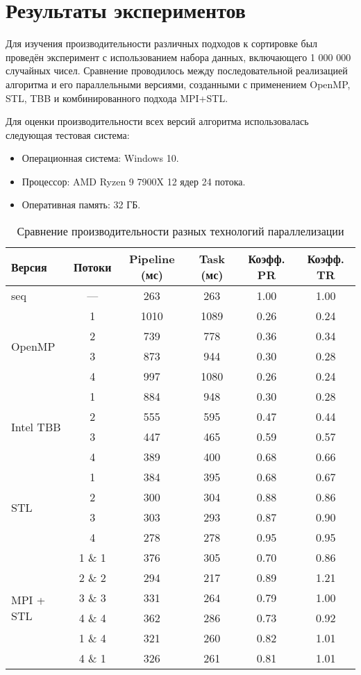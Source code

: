 \documentclass[12pt]{article}
\begin{document}
\newpage

\section{Результаты экспериментов}
Для изучения производительности различных подходов к сортировке был проведён эксперимент с использованием набора данных, включающего 1 000 000 случайных чисел. Сравнение проводилось между последовательной реализацией алгоритма и его параллельными версиями, созданными с применением OpenMP, STL, TBB и комбинированного подхода MPI+STL.

Для оценки производительности всех версий алгоритма использовалась следующая тестовая система:
\begin{itemize}
    \item Операционная система: Windows 10.
    \item Процессор: AMD Ryzen 9 7900X 12 ядер 24 потока.
    \item Оперативная память: 32 ГБ.
\end{itemize}

\begin{table}[H]
\centering
\begin{tabular}{|l|c|c|c|c|c|}
\hline
\textbf{Версия} & \textbf{Потоки} & \textbf{Pipeline (мс)} & \textbf{Task (мс)} & \textbf{Коэфф. PR} & \textbf{Коэфф. TR} \\
\hline
seq & —    & 263 & 263 & 1.00 & 1.00 \\
\hline
\multirow{4}{*}{OpenMP} 
    & 1    & 1010 & 1089 & 0.26 & 0.24 \\
    & 2    & 739  & 778  & 0.36 & 0.34 \\
    & 3    & 873  & 944  & 0.30 & 0.28 \\
    & 4    & 997  & 1080 & 0.26 & 0.24 \\
\hline
\multirow{4}{*}{Intel TBB} 
    & 1    & 884  & 948  & 0.30 & 0.28 \\
    & 2    & 555  & 595  & 0.47 & 0.44 \\
    & 3    & 447  & 465  & 0.59 & 0.57 \\
    & 4    & 389  & 400  & 0.68 & 0.66 \\
\hline
\multirow{4}{*}{STL} 
    & 1    & 384  & 395  & 0.68 & 0.67 \\
    & 2    & 300  & 304  & 0.88 & 0.86 \\
    & 3    & 303  & 293  & 0.87 & 0.90 \\
    & 4    & 278  & 278  & 0.95 & 0.95 \\
\hline
\multirow{6}{*}{MPI + STL} 
    & 1 \& 1 & 376  & 305  & 0.70 & 0.86 \\
    & 2 \& 2& 294  & 217  & 0.89 & 1.21 \\
    & 3 \& 3& 331  & 264  & 0.79 & 1.00 \\
    & 4 \& 4& 362  & 286  & 0.73 & 0.92 \\
    & 1 \& 4& 321  & 260  & 0.82 & 1.01 \\
    & 4 \& 1& 326  & 261  & 0.81 & 1.01 \\
\hline
\end{tabular}
\caption{Сравнение производительности разных технологий параллелизации}
\label{tab:parallel_perf}
\end{table}
\end{document}
